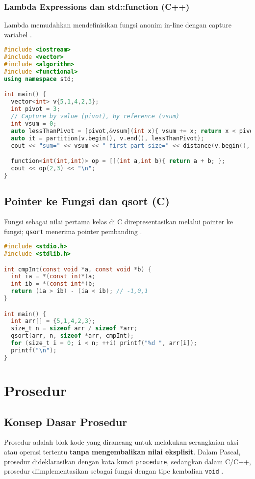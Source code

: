 \documentclass[../main.tex]{subfiles}
\begin{document}
\subsubsection{Lambda Expressions dan std::function (C++)}
Lambda memudahkan mendefinisikan fungsi anonim in-line dengan capture variabel \parencite{cpp-lambda,cpp-std-function}.
\begin{lstlisting}[language=C++, caption={Lambda dan std::function}]
#include <iostream>
#include <vector>
#include <algorithm>
#include <functional>
using namespace std;

int main() {
  vector<int> v{5,1,4,2,3};
  int pivot = 3;
  // Capture by value (pivot), by reference (vsum)
  int vsum = 0;
  auto lessThanPivot = [pivot,&vsum](int x){ vsum += x; return x < pivot; };
  auto it = partition(v.begin(), v.end(), lessThanPivot);
  cout << "sum=" << vsum << " first part size=" << distance(v.begin(), it) << "\n";

  function<int(int,int)> op = [](int a,int b){ return a + b; };
  cout << op(2,3) << "\n";
}
\end{lstlisting}

\subsection{Pointer ke Fungsi dan qsort (C)}
Fungsi sebagai nilai pertama kelas di C direpresentasikan melalui pointer ke fungsi; \texttt{qsort} menerima pointer pembanding \parencite{c-function-pointers,c-qsort}.
\begin{lstlisting}[language=C, caption={qsort dengan pointer ke fungsi (C)}]
#include <stdio.h>
#include <stdlib.h>

int cmpInt(const void *a, const void *b) {
  int ia = *(const int*)a;
  int ib = *(const int*)b;
  return (ia > ib) - (ia < ib); // -1,0,1
}

int main() {
  int arr[] = {5,1,4,2,3};
  size_t n = sizeof arr / sizeof *arr;
  qsort(arr, n, sizeof *arr, cmpInt);
  for (size_t i = 0; i < n; ++i) printf("%d ", arr[i]);
  printf("\n");
}
\end{lstlisting}

\section{Prosedur}

\subsection{Konsep Dasar Prosedur}
Prosedur adalah blok kode yang dirancang untuk melakukan serangkaian aksi atau operasi tertentu \textbf{tanpa mengembalikan nilai eksplisit}. Dalam Pascal, prosedur dideklarasikan dengan kata kunci \texttt{procedure}, sedangkan dalam C/C++, prosedur diimplementasikan sebagai fungsi dengan tipe kembalian \texttt{void} \parencite{pascal-procedure-function,c-functions}.
\end{document}
